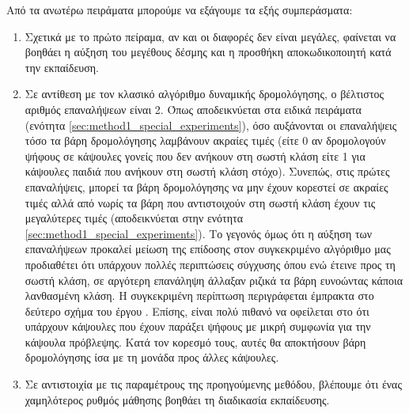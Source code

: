 Από τα ανωτέρω πειράματα μπορούμε να εξάγουμε τα εξής συμπεράσματα:
\begin{enumerate}
    \item Σχετικά με το πρώτο πείραμα, αν και οι διαφορές δεν είναι μεγάλες, φαίνεται να βοηθάει η αύξηση του μεγέθους δέσμης και η προσθήκη αποκωδικοποιητή κατά την εκπαίδευση.
    \item Σε αντίθεση με τον κλασικό αλγόριθμο δυναμικής δρομολόγησης, ο βέλτιστος αριθμός επαναλήψεων είναι 2. Όπως αποδεικνύεται στα ειδικά πειράματα (ενότητα \ref{sec:method1_special_experiments}), όσο αυξάνονται οι επαναλήψεις τόσο τα βάρη δρομολόγησης λαμβάνουν ακραίες τιμές (είτε 0 αν δρομολογούν ψήφους σε κάψουλες γονείς που δεν ανήκουν στη σωστή κλάση είτε 1 για κάψουλες παιδιά που ανήκουν στη σωστή κλάση στόχο). Συνεπώς, στις πρώτες επαναλήψεις, μπορεί τα βάρη δρομολόγησης να μην έχουν κορεστεί σε ακραίες τιμές αλλά από νωρίς τα βάρη που αντιστοιχούν στη σωστή κλάση έχουν τις μεγαλύτερες τιμές (αποδεικνύεται στην ενότητα \ref{sec:method1_special_experiments}). Το γεγονός όμως ότι η αύξηση των επαναλήψεων προκαλεί μείωση της επίδοσης στον συγκεκριμένο αλγόριθμο μας προδιαθέτει ότι υπάρχουν πολλές περιπτώσεις σύγχυσης όπου ενώ έτεινε προς τη σωστή κλάση, σε αργότερη επανάληψη άλλαξαν ριζικά τα βάρη ευνοώντας κάποια λανθασμένη κλάση. Η συγκεκριμένη περίπτωση περιγράφεται έμπρακτα στο δεύτερο σχήμα του έργου \cite{hinton2018matrix}. Επίσης, είναι πολύ πιθανό να οφείλεται στο ότι υπάρχουν κάψουλες που έχουν παράξει ψήφους με μικρή συμφωνία για την κάψουλα πρόβλεψης. Κατά τον κορεσμό τους, αυτές θα αποκτήσουν βάρη δρομολόγησης ίσα με τη μονάδα προς άλλες κάψουλες.
    \item Σε αντιστοιχία με τις παραμέτρους της προηγούμενης μεθόδου, βλέπουμε ότι ένας χαμηλότερος ρυθμός μάθησης βοηθάει τη διαδικασία εκπαίδευσης.
\end{enumerate}
